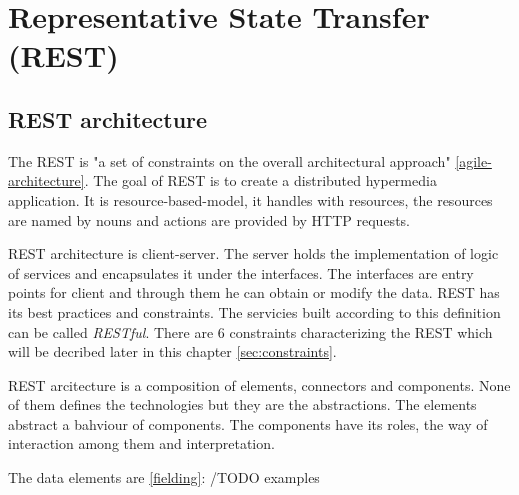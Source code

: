 \chapter{Representative State Transfer (REST)}
\label{chap:rest}

\section{REST architecture}
\label{sec:rest-architecture}

The REST is "a set of constraints on the overall architectural approach" \ref{agile-architecture}. The goal of REST is to create a distributed hypermedia application. It is \gls{resource-based-model}, it handles with resources, the resources are named by nouns and actions are provided by HTTP requests. 

REST architecture is client-server. The server holds the implementation of logic of services and encapsulates it under the interfaces. The interfaces are entry points for client and through them he can obtain or modify the data.
REST has its best practices and constraints. The servicies built according to this definition can be called \emph{RESTful}. There are 6 constraints characterizing the REST which will be decribed later in this chapter \ref{sec:constraints}.

REST arcitecture is a composition of elements, connectors and components. None of them defines the technologies but they are the abstractions. The elements abstract a bahviour of components. The components have its roles, the way of interaction among them and interpretation.

The data elements are \ref{fielding}: /TODO examples

